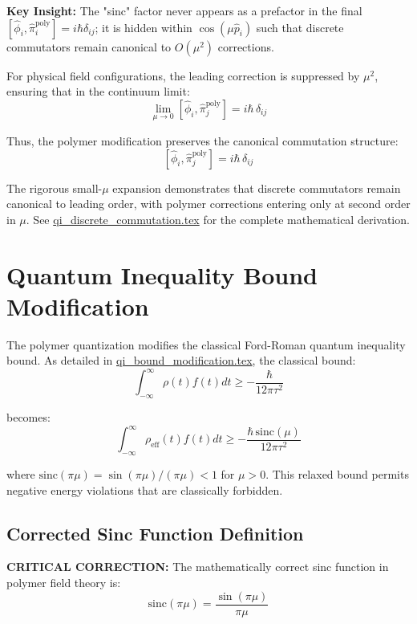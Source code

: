 \documentclass[12pt]{article}
\begin{document}
\textbf{Key Insight:} The "sinc" factor never appears as a prefactor in the final $[\hat{\phi}_i, \hat{\pi}_i^{\text{poly}}] = i\hbar\delta_{ij}$; it is hidden within $\cos(\mu \hat{p}_i)$ such that discrete commutators remain canonical to $O(\mu^2)$ corrections.

For physical field configurations, the leading correction is suppressed by $\mu^2$, ensuring that in the continuum limit:
\begin{equation}
\lim_{\mu \to 0} [\hat{\phi}_i, \hat{\pi}_j^{\text{poly}}] = i\hbar\,\delta_{ij}
\end{equation}

Thus, the polymer modification preserves the canonical commutation structure:
\begin{equation}
\boxed{[\hat{\phi}_i, \hat{\pi}_j^{\text{poly}}] = i\hbar\,\delta_{ij}}
\end{equation}

The rigorous small-$\mu$ expansion demonstrates that discrete commutators remain canonical to leading order, with polymer corrections entering only at second order in $\mu$. See \href{file:qi_discrete_commutation.tex}{qi\_discrete\_commutation.tex} for the complete mathematical derivation.

\section{Quantum Inequality Bound Modification}

The polymer quantization modifies the classical Ford-Roman quantum inequality bound. As detailed in \href{file:qi_bound_modification.tex}{qi\_bound\_modification.tex}, the classical bound:
\begin{equation}
\int_{-\infty}^{\infty} \rho(t) f(t) dt \geq -\frac{\hbar}{12\pi\tau^2}
\end{equation}

becomes:
\begin{equation}
\int_{-\infty}^{\infty} \rho_{\text{eff}}(t) f(t) dt \geq -\frac{\hbar\,\mathrm{sinc}(\mu)}{12\pi\tau^2}
\end{equation}

where $\mathrm{sinc}(\pi\mu) = \sin(\pi\mu)/(\pi\mu) < 1$ for $\mu > 0$. This relaxed bound permits negative energy violations that are classically forbidden.

\subsection{Corrected Sinc Function Definition}
\textbf{CRITICAL CORRECTION:} The mathematically correct sinc function in polymer field theory is:
\begin{equation}
\boxed{\mathrm{sinc}(\pi\mu) = \frac{\sin(\pi\mu)}{\pi\mu}}
\end{equation}
\end{document}
